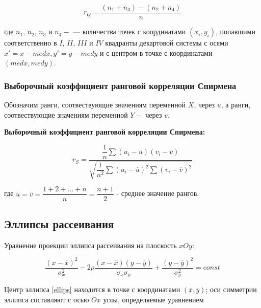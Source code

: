 \documentclass[a4paper]{article}
\begin{document}
        \begin{equation} \label{square_cor}
            r_Q = \dfrac{(n_1 + n_3) - (n_2 + n_4)}{n}
        \end{equation}
        
        где $n_1$, $n_2$, $n_3$ и $n_4 -$ — количества точек с координатами $(x_i, y_i)$, попавшими соответственно в $I$, $II$, $III$ и $IV$ квадранты декартовой системы с осями $x' = x - med x, y' = y - med y$ и с центром в точке с координатами $(med x, med y)$.
        
        \subsubsection{Выборочный коэффициент ранговой корреляции Спирмена}
            
            Обозначим ранги, соотвествующие значениям переменной $X$, через $u$,  а ранги, соотвествующие значениям переменной $Y - $ через $v$.
            
            \textbf{Выборочный коэффициент ранговой корреляции Спирмена:}
            
            \begin{equation} \label{sperman}
                r_S = \dfrac{\dfrac{1}{n} \sum(u_i - \overline{u})(v_i - \overline{v})}{\sqrt{\dfrac{1}{n^2} \sum(u_i - \overline{u})^2 \sum(v_i - \overline{v})^2}}
            \end{equation}
            
            где $\overline{u} = \overline{v} = \dfrac{1 + 2 + ... + n}{n} = \dfrac{n + 1}{2}$ - среднее значение рангов.
            
    \subsection{Эллипсы рассеивания}
        
        Уравнение проекции эллипса рассеивания на плоскость $xOy$:
        
        \begin{equation} \label{ellips}
            \dfrac{(x - \overline{x})^2}{\sigma^2_x} - 2 \rho \dfrac{(x - \overline{x})(y - \overline{y})}{\sigma_x \sigma_y} + \dfrac{(y - \overline{y})^2}{\sigma^2_y} = const
        \end{equation}
        
        Центр эллипса \eqref{ellips} находится в точке с координатами $(\overline{x}, \overline{y})$; оси симметрии эллипса составляют с осью $Ox$ углы, определяемые уравнением
        
\end{document}
